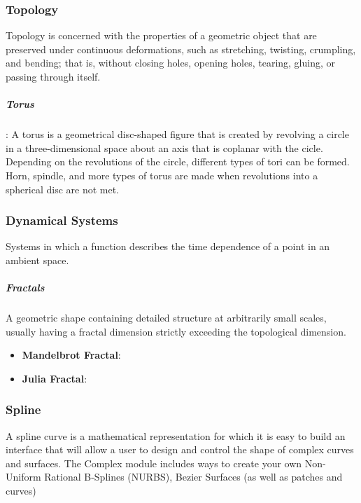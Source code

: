 \documentclass[12pt, letterpaper]{article}
\begin{document}
\begin{sloppypar}
\begin{flushleft}
\subsubsection{Topology}
Topology is concerned with the properties of a geometric object that are preserved under
continuous deformations, such as stretching, twisting, crumpling, and bending; that is,
without closing holes, opening holes, tearing, gluing, or passing through itself.

\subparagraph*{Torus}: A torus is a geometrical disc-shaped figure that is created by
revolving a circle in a three-dimensional space about an axis that is coplanar with the 
cicle. Depending on the revolutions of the circle, different types of tori can be formed. 
Horn, spindle, and more types of torus are made when revolutions into a spherical disc 
are not met.

\subsubsection{Dynamical Systems}
Systems in which a function describes the time dependence of a point in an ambient space. 
\subparagraph*{Fractals} A geometric shape containing detailed structure at arbitrarily 
small scales, usually having a fractal dimension strictly exceeding the topological 
dimension. \\

\begin{itemize}
\item \textbf{Mandelbrot Fractal}: \\

\item \textbf{Julia Fractal}: \\

\end{itemize}


\subsubsection{Spline}
A spline curve is a mathematical representation for which it is easy to build an interface 
that will allow a user to design and control the shape of complex curves and surfaces.
The Complex module includes ways to create your own Non-Uniform Rational B-Splines (NURBS),
Bezier Surfaces (as well as patches and curves)


\end{flushleft}
\end{sloppypar}
\end{document}
